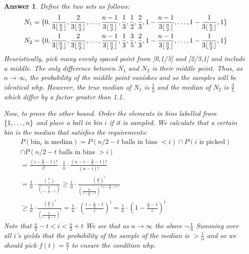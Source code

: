 \documentclass[12pt]{article}
\theoremstyle{colon}
\newtheorem*{answer}{Answer}
\begin{document}
\begin{answer}
  Define the two sets as follows:
  \begin{gather*}
    N_1 = \{ 0, \frac{1}{3 \lfloor \frac{n}{2} \rfloor }, \frac{2}{3 \lfloor \frac{n}{2} \rfloor }, \mathellipsis, \frac{n-1}{3 \lfloor \frac{n}{2} \rfloor }, \frac{1}{3}, \frac{1}{2}, \frac{2}{3}, 1- \frac{n-1}{3 \lfloor \frac{n}{2} \rfloor }, \mathellipsis, 1- \frac{1}{3 \lfloor \frac{n}{2} \rfloor }, 1 \} \\
    N_2 = \{ 0, \frac{1}{3 \lfloor \frac{n}{2} \rfloor }, \frac{2}{3 \lfloor \frac{n}{2} \rfloor }, \mathellipsis, \frac{n-1}{3 \lfloor \frac{n}{2} \rfloor }, \frac{1}{3}, \frac{3}{5}, \frac{2}{3}, 1- \frac{n-1}{3 \lfloor \frac{n}{2} \rfloor }, \mathellipsis, 1- \frac{1}{3 \lfloor \frac{n}{2} \rfloor }, 1 \}
  \end{gather*}
  Heuristically, pick many evenly spaced point from [0,1/3] and [2/3,1] and include a middle. The only difference between $N_1$ and $N_2$ is their middle point. Thus, as $n \rightarrow \infty$, the probability of the middle point vanishes and so the samples will be identical whp. However, the true median of $N_1$ is $\frac{1}{2}$ and the median of $N_2$ is $\frac{3}{5}$ which differ by a factor greater than 1.1.

  Now, to prove the other bound. Order the elements in bins labelled from $\{1, \mathellipsis, n\}$ and place a ball in bin $i$ if it is sampled. We calculate that a certain bin is the median that satisfies the requirements:
  \begin{gather*}
    P(\text{bin}_i \text{ is median}) = P(n/2 - t \text{ balls in bins } < i) \cap P(i \text{ is picked}) \\
    \cap P(n/2 - t \text{ balls in bins } > i) \\
    = \frac{(i-\frac{n}{2}-t)!}{i!} \cdot \frac{1}{n} \cdot \frac{(n-i-\frac{n}{2}-t)!}{(n-i)!} \\
    = \frac{1}{n} \cdot \frac{\binom{n}{i}}{\binom{n}{i-\frac{n}{2}-t}} \geq \frac{1}{n} \cdot \frac{(\frac{n}{i})^i}{(\frac{n}{i-\frac{n}{2}-t})^{(i-\frac{n}{2}-t)}} \\
    \geq \frac{1}{n} \cdot \frac{(\frac{n}{i})^i}{(\frac{n}{i-\frac{n}{2}-t})^i} = \frac{1}{n} \cdot \left( \frac{i-\frac{n}{2}-t}{i} \right)^i
    = \frac{1}{n} \cdot \left( 1 -\frac{\frac{n}{2}-t}{i} \right)^i
  \end{gather*}
  Note that $\frac{n}{2}-t < i < \frac{n}{2}+t$
  We see that as $n \rightarrow \infty$ the above $\sim \frac{1}{n}$
  Summing over all $i$'s yields that the probability of the sample of the median is $> \frac{t}{n}$ and so we should pick $f(t) = \frac{n}{t}$ to ensure the condition whp.
\end{answer}
\end{document}
